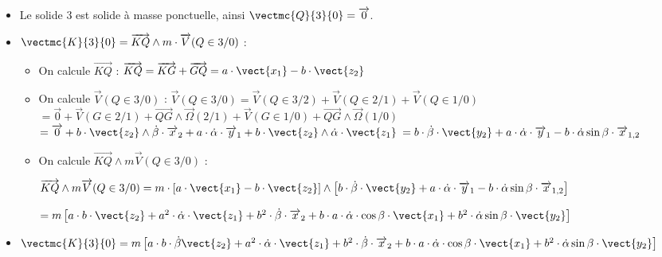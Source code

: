 \ifprof
\begin{corrige}
\begin{itemize}
\item Le solide $3$ est solide à masse ponctuelle, ainsi $\vectmc{Q}{3}{0}=\overrightarrow{0}$.
\item $\vectmc{K}{3}{0}=\overrightarrow{KQ}\wedge m\cdot \overrightarrow{V}(Q\in 3/0)$ : 
\begin{itemize}
\item On calcule $\overrightarrow{KQ}$ : 
$
\overrightarrow{KQ}=\overrightarrow{KG}+\overrightarrow{GQ}=a\cdot \vect{x_{1}}-b\cdot \vect{z_2}
$
\item On calcule $\overrightarrow{V}(Q\in 3/0)$ : 
$
\overrightarrow{V}(Q\in 3/0)=\overrightarrow{V}(Q\in 3/2)+\overrightarrow{V}(Q\in 2/1)+\overrightarrow{V}(Q\in 1/0)
$
$=\overrightarrow{0}+\overrightarrow{V}(G\in 2/1)+\overrightarrow{QG}\wedge \overrightarrow{\Omega}(2/1)
+\overrightarrow{V}(G\in 1/0)+\overrightarrow{QG}\wedge \overrightarrow{\Omega}(1/0)$
$=\overrightarrow{0}+b\cdot \vect{z_2}\wedge \dot{\beta}\cdot \overrightarrow{x}_2+ a\cdot \dot{\alpha}\cdot \overrightarrow{y}_1+b\cdot \vect{z_2}\wedge \dot{\alpha}\cdot \vect{z_{1}}$
$=b\cdot \dot{\beta}\cdot \vect{y_{2}}+a\cdot \dot{\alpha}\cdot \overrightarrow{y}_1-b\cdot\dot{\alpha} \sin\beta\cdot \overrightarrow{x}_{1,2}$


\item On calcule $\overrightarrow{KQ}\wedge m\overrightarrow{V}(Q\in 3/0)$ : 

$\overrightarrow{KQ}\wedge m\overrightarrow{V}(Q\in 3/0)=m\cdot \left[a\cdot \vect{x_{1}}-b\cdot \vect{z_2}\right]\wedge\left[b\cdot \dot{\beta}\cdot \vect{y_{2}}+a\cdot \dot{\alpha}\cdot \overrightarrow{y}_1-b\cdot\dot{\alpha} \sin\beta\cdot \overrightarrow{x}_{1,2}\right]$

$=m\left[a\cdot b\cdot \vect{z_2}+a^2\cdot \dot{\alpha}\cdot\vect{z_{1}}+b^2\cdot \dot{\beta}\cdot\overrightarrow{x}_2+b\cdot a\cdot \dot{\alpha}\cdot \cos\beta\cdot \vect{x_{1}}+b^2\cdot \dot{\alpha}\sin\beta\cdot \vect{y_{2}}\right]
$
\end{itemize}

\item
$
\vectmc{K}{3}{0}=m\left[a\cdot b\cdot\dot{\beta} \vect{z_2}+a^2\cdot \dot{\alpha}\cdot\vect{z_{1}}+b^2\cdot \dot{\beta}\cdot\overrightarrow{x}_2+b\cdot a\cdot \dot{\alpha}\cdot \cos\beta\cdot \vect{x_{1}}+b^2\cdot \dot{\alpha}\sin\beta\cdot \vect{y_{2}}\right]
$

\end{itemize}

\end{corrige}
\else
\fi


